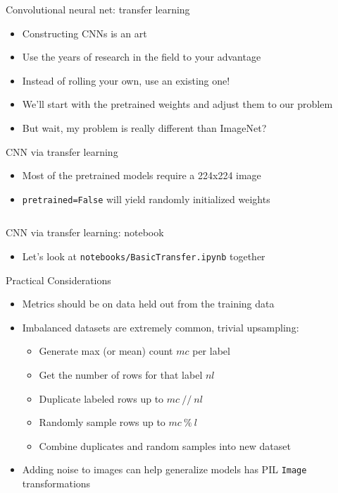 \documentclass[hyperref={pdfpagelabels=false},12pt]{beamer}
\newcommand{\code}[2]{\texttt{#2}}
\newcommand{\python}[1]{\code{python}{#1}}
\newcommand{\namedUrl}[2]{\href{#1}{\color{blue}{#2}}}
\newcommand{\pygment}[3]{\inputminted[bgcolor=lightgray,linenos,fontsize=#1]{#2}{#3}}
\begin{document}
\begin{frame}{Convolutional neural net: transfer learning}
  \begin{itemize}
    \item Constructing CNNs is an art
    \item Use the years of research in the field to your advantage
    \item Instead of rolling your own, use an existing one!
    \item We'll start with the pretrained weights and adjust them to our problem
    \item But wait, my problem is really different than ImageNet?
  \end{itemize}
\end{frame}

\begin{frame}{CNN via transfer learning}
  \begin{itemize}
    \item Most of the pretrained models require a 224x224 image
    \item \python{pretrained=False} will yield randomly initialized weights
  \end{itemize}
  \pygment{\scriptsize}{python}{code/transfer-model.py}
\end{frame}

\begin{frame}{CNN via transfer learning: notebook}
  \begin{itemize}
    \item Let's look at \texttt{notebooks/BasicTransfer.ipynb} together
  \end{itemize}
\end{frame}

\begin{frame}{Practical Considerations}
  \begin{itemize}
    \item Metrics should be on data held out from the training data
    \item Imbalanced datasets are extremely common, trivial upsampling:
    \begin{itemize}
      \item Generate max (or mean) count $mc$ per label
      \item Get the number of rows for that label $nl$
      \item Duplicate labeled rows up to $mc\ //\ nl$
      \item Randomly sample rows up to $mc\ \%\ l$
      \item Combine duplicates and random samples into new dataset
    \end{itemize}
    \item Adding noise to images can help generalize models
      \namedUrl{https://pytorch.org/docs/stable/torchvision/transforms.html}{Torchvision
      transforms} has PIL \python{Image} transformations
  \end{itemize}
\end{frame}
\end{document}

